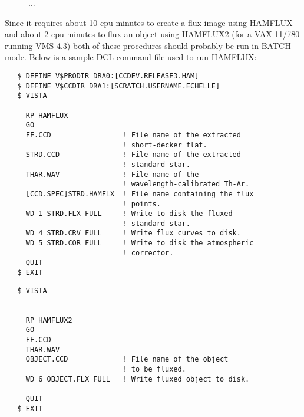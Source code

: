 \begin{figure}[t]
   \centering
   \vspace{4.0in}
   \caption[]{\label{fig:hamflux} ... }
\end{figure}

Since it requires about 10 cpu minutes to create a flux image using {\tenit
HAMFLUX} and about 2 cpu minutes to flux an object using {\tenit HAMFLUX2}
(for a VAX 11/780 running VMS 4.3) both of these procedures should probably be
run in BATCH mode. Below is a sample DCL command file used to run {\tenit
HAMFLUX}:

\vskip 0.5in

\begin{verbatim}
   $ DEFINE V$PRODIR DRA0:[CCDEV.RELEASE3.HAM]
   $ DEFINE V$CCDIR DRA1:[SCRATCH.USERNAME.ECHELLE]
   $ VISTA

     RP HAMFLUX
     GO
     FF.CCD                 ! File name of the extracted
                            ! short-decker flat.
     STRD.CCD               ! File name of the extracted
                            ! standard star.
     THAR.WAV               ! File name of the
                            ! wavelength-calibrated Th-Ar.
     [CCD.SPEC]STRD.HAMFLX  ! File name containing the flux
                            ! points.
     WD 1 STRD.FLX FULL     ! Write to disk the fluxed
                            ! standard star.
     WD 4 STRD.CRV FULL     ! Write flux curves to disk.
     WD 5 STRD.COR FULL     ! Write to disk the atmospheric
                            ! corrector.
     QUIT
   $ EXIT
\end{verbatim}

\vskip 0.2in


\vskip 0.2in
\begin{verbatim}
   $ VISTA


     RP HAMFLUX2
     GO
     FF.CCD
     THAR.WAV
     OBJECT.CCD             ! File name of the object
                            ! to be fluxed.
     WD 6 OBJECT.FLX FULL   ! Write fluxed object to disk.

     QUIT
   $ EXIT
\end{verbatim}

\vskip 0.5in

